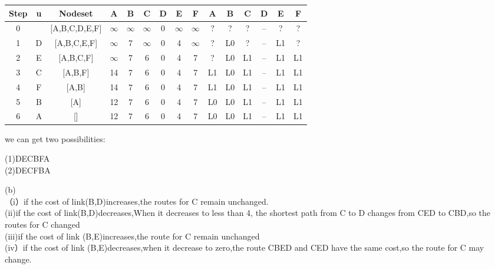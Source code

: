 \documentclass[UTF8,oneside]{article}
\begin{document}
\begin{table}[h]
\centering
\begin{tabular}{|c|c|c|c|c|c|c|c|c|c|c|c|c|c|c|}
\hline
Step& u &Nodeset &A &B &C &D &E &F &A &B &C &D &E &F \\
\hline
0 &  &[A,B,C,D,E,F] &$\infty$ &$\infty$ &$\infty$& 0 &$\infty$ &$\infty$ &? &? & ? & -- &? &?\\
\hline
1 & D &[A,B,C,E,F] &$\infty$ &7 &$\infty$& 0 &4 &$\infty$ &? &L0 & ? & -- &L1 &?\\
\hline
2 & E &[A,B,C,F] &$\infty$ &7 & 6 & 0 &4 &7 &? &L0 & L1 & -- &L1 &L1 \\
\hline
3 & C &[A,B,F] &14 &7 & 6 & 0 &4 &7 &L1 &L0 & L1 & -- &L1 &L1 \\
\hline
4 & F &[A,B] &14 &7 & 6 & 0 &4 &7 &L1 &L0 & L1 & -- &L1 &L1 \\
\hline
5& B &[A]  &12 &7 & 6 & 0 &4 &7	 &L0 &L0 & L1 & -- &L1 &L1 \\
\hline
6 & A &[]  &12 &7 & 6 & 0 &4 &7&L0 &L0 & L1 & -- &L1 &L1 \\
\hline
\end{tabular}
\label{TAB1}
\end{table}
we can get two possibilities:
\begin{center}
(1)DECBFA\\
(2)DECFBA
\end{center}
(b)\\
（i）if the cost of link(B,D)increases,the routes for C remain unchanged.\\
(ii)if the cost of link(B,D)decreases,When it decreases to less than 4, the shortest path from C to D changes from CED to CBD,so the routes for C changed\\
(iii)if the cost of link (B,E)increases,the route for C remain unchanged\\
(iv）if the cost of link (B,E)decreases,when it decrease to zero,the route CBED and CED have the same cost,so the route for C may change.
\end{document}
